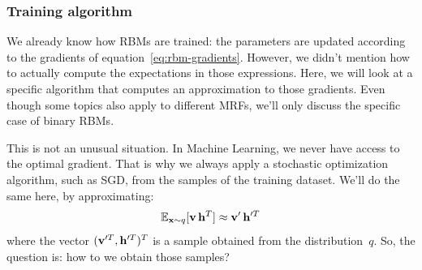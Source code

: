 \subsubsection{Training algorithm}

We already know how RBMs are trained: the parameters are updated according to
the gradients of equation~\eqref{eq:rbm-gradients}. However, we didn't mention
how to actually compute the expectations in those expressions. Here, we will
look at a specific algorithm that computes an approximation to those
gradients. Even though some topics also apply to different MRFs, we'll only
discuss the specific case of binary RBMs.

This is not an unusual situation. In Machine Learning, we never have access to
the optimal gradient. That is why we always apply a stochastic optimization
algorithm, such as SGD, from the samples of the training dataset. We'll do the
same here, by approximating:
\begin{equation}
	\mathbb{E}_{\mathbf{x} \sim q}[\mathbf{v}\,\mathbf{h}^T] \approx \mathbf{v}'\,\mathbf{h}'^T
\end{equation}
where the vector $(\mathbf{v}'^T, \mathbf{h}'^T)^T$ is a sample obtained from the
distribution~$q$. So, the question is: how to we obtain those samples?

